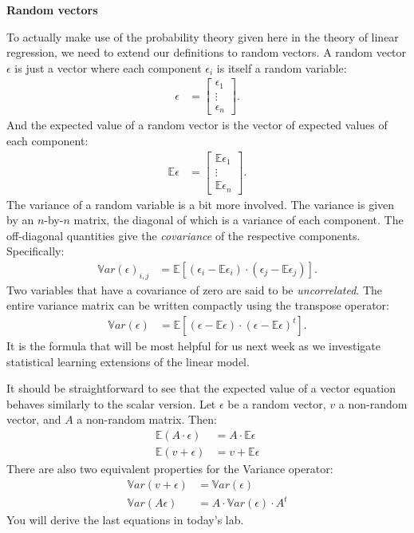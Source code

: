 \documentclass[12pt,hidelinks]{article}
\numberwithin{equation}{section}
\begin{document}
\textbf{Random vectors}

To actually make use of the probability theory given here in the theory of
linear regression, we need to extend our definitions to random vectors. A random
vector $\epsilon$ is just a vector where each component $\epsilon_i$ is itself
a random variable:
\begin{align}
\epsilon &= \begin{bmatrix} \epsilon_1 \\ \vdots \\ \epsilon_n \end{bmatrix}.
\end{align}
And the expected value of a random vector is the vector of expected values of
each component:
\begin{align}
\mathbb{E}\epsilon &= \begin{bmatrix} \mathbb{E}\epsilon_1 \\ \vdots \\ \mathbb{E}\epsilon_n \end{bmatrix}.
\end{align}
The variance of a random variable is a bit more involved. The variance is
given by an $n$-by-$n$ matrix, the diagonal of which is a variance of each
component. The off-diagonal quantities give the \textit{covariance} of the
respective components. Specifically:
\begin{align}
\mathbb{V}ar(\epsilon)_{i,j} &= \mathbb{E} \left[ \left(\epsilon_i - \mathbb{E} \epsilon_i \right)
\cdot \left(\epsilon_j - \mathbb{E} \epsilon_j \right) \right].
\end{align}
Two variables that have a covariance of zero are said to be \textit{uncorrelated}.
The entire variance matrix can be written compactly using the transpose operator:
\begin{align}
\mathbb{V}ar(\epsilon) &= \mathbb{E} \left[ \left(\epsilon - \mathbb{E} \epsilon \right)
\cdot \left(\epsilon - \mathbb{E} \epsilon \right)^t \right].
\end{align}
It is the formula that will be most helpful for us next week as we investigate
statistical learning extensions of the linear model.

It should be straightforward to see that the expected value of a vector equation
behaves similarly to the scalar version. Let $\epsilon$ be a random vector,
$v$ a non-random vector, and $A$ a non-random matrix. Then:
\begin{align}
\mathbb{E}(A \cdot \epsilon) &= A \cdot \mathbb{E}\epsilon \\
\mathbb{E}(v + \epsilon) &= v + \mathbb{E}\epsilon
\end{align}
There are also two equivalent properties for the Variance operator:
\begin{align}
\mathbb{V}ar(v + \epsilon) &= \mathbb{V}ar(\epsilon)\\
\mathbb{V}ar(A\epsilon) &= A \cdot \mathbb{V}ar(\epsilon) \cdot A^t
\end{align}
You will derive the last equations in today's lab.
\end{document}
